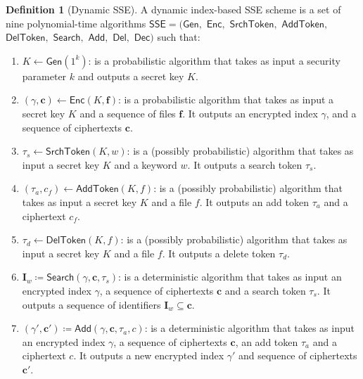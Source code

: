 \documentclass[12pt,a4paper]{article}
\theoremstyle{definition}
\newtheorem{definition}{Definition}
\begin{document}
\begin{definition}[Dynamic SSE]
A dynamic index-based SSE scheme is a set of nine polynomial-time algorithms
\(\mathsf{SSE = (Gen,}\) \(\mathsf{Enc,}\) \(\mathsf{SrchToken,}\)
\(\mathsf{AddToken,}\) \(\mathsf{DelToken,}\) \(\mathsf{Search,}\)
\(\mathsf{Add,}\) \(\mathsf{Del,}\) \(\mathsf{Dec})\) such that:

\begin{enumerate}
\item \(K \leftarrow \mathsf{Gen}(1^k)\): is a probabilistic algorithm that
	takes as input a security parameter \(k\) and outputs a secret key
	\(K\).

\item \((\gamma, \mathbf{c}) \leftarrow \mathsf{Enc}(K, \mathbf{f})\): is a
	probabilistic algorithm that takes as input a secret key \(K\) and
	a sequence of files \(\mathbf{f}\). It outputs an encrypted index
	\(\gamma\), and a sequence of ciphertexts \(\mathbf{c}\).

\item \(\tau_s \leftarrow \mathsf{SrchToken}(K, w)\): is a (possibly
	probabilistic) algorithm that takes as input a secret key \(K\) and a
	keyword \(w\). It outputs a search token \(\tau_s\).

\item \((\tau_a, c_f) \leftarrow \mathsf{AddToken}(K, f)\): is a (possibly
	probabilistic) algorithm that takes as input a secret key \(K\) and a
	file \(f\). It outputs an add token \(\tau_a\) and a ciphertext
	\(c_f\).

\item \(\tau_d \leftarrow \mathsf{DelToken}(K, f)\): is a (possibly
	probabilistic) algorithm that takes as input a secret key \(K\) and a
	file \(f\). It outputs a delete token \(\tau_d\).

\item \(\mathbf{I}_w \coloneqq \mathsf{Search}(\gamma, \mathbf{c}, \tau_s)\):
	is a deterministic algorithm that takes as input an encrypted index
	\(\gamma\), a sequence of ciphertexts \(\mathbf{c}\) and a search
	token \(\tau_s\). It outputs a sequence of identifiers \(\mathbf{I}_w
	\subseteq \mathbf{c}\).

\item \((\gamma', \mathbf{c}') \coloneqq \mathsf{Add}(\gamma, \mathbf{c},
	\tau_a, c)\): is a deterministic algorithm that takes as input an
	encrypted index \(\gamma\), a sequence of ciphertexts \(\mathbf{c}\),
	an add token \(\tau_a\) and a ciphertext \(c\). It outputs a new
	encrypted index \(\gamma'\) and sequence of ciphertexts
	\(\mathbf{c}'\).


\end{enumerate}
\end{definition}
\end{document}
